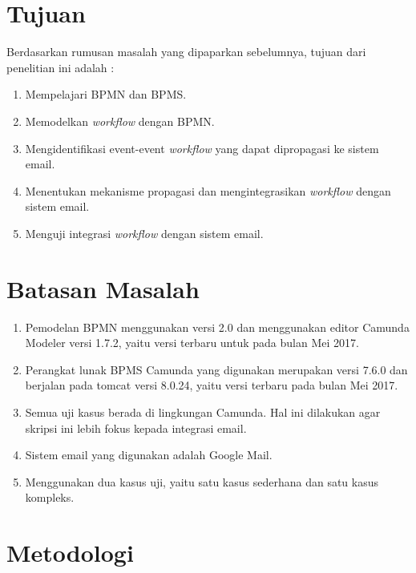 \section{Tujuan}
\label{sec:tujuan}

Berdasarkan rumusan masalah yang dipaparkan sebelumnya, tujuan dari penelitian ini adalah :
\begin{enumerate}
	\item Mempelajari BPMN dan BPMS.
	\item Memodelkan \textit{workflow} dengan BPMN.
	\item Mengidentifikasi event-event \textit{workflow} yang dapat dipropagasi ke sistem email.
	\item Menentukan mekanisme propagasi dan mengintegrasikan \textit{workflow} dengan sistem email.
	\item Menguji integrasi \textit{workflow} dengan sistem email.
\end{enumerate}




\section{Batasan Masalah}
\label{sec:batasan}
\begin{enumerate}
	\item Pemodelan BPMN menggunakan versi 2.0 dan menggunakan editor Camunda Modeler versi 1.7.2, yaitu versi terbaru untuk pada bulan Mei 2017.
	\item Perangkat lunak BPMS Camunda yang digunakan merupakan versi 7.6.0 dan berjalan pada tomcat versi 8.0.24, yaitu versi terbaru pada bulan Mei 2017.
	\item Semua uji kasus berada di lingkungan Camunda. Hal ini dilakukan agar skripsi ini lebih fokus kepada integrasi email.
	\item Sistem email yang digunakan adalah Google Mail.
	\item Menggunakan dua kasus uji, yaitu satu kasus sederhana dan satu kasus kompleks.
\end{enumerate}




\section{Metodologi}
\label{sec:metlit}

